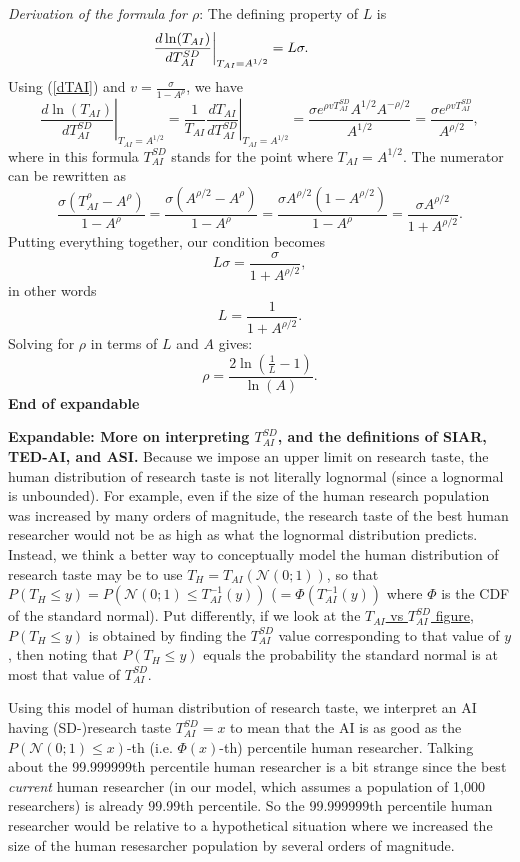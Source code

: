 \documentclass{article}
\theoremstyle{definition}
\begin{document}
\textit{Derivation of the formula for $\rho$}: The defining property of $L$ is
\begin{equation} \label{L}
\left.\frac{d \ln(T_{AI})}{d T_{AI}^{SD}} \right|_{T_{AI} = A^{1/2}} = L \sigma. \hspace*{1.5cm}
\end{equation}
Using (\ref{dTAI}) and $v = \frac{\sigma}{1-A^\rho}$, we have
\[
\left. \frac{d \ln(T_{AI})}{d T_{AI}^{SD}}\right|_{T_{AI} = A^{1/2}} = \left.\frac{1}{T_{AI}}\frac{d T_{AI}}{d T_{AI}^{SD}} \right|_{T_{AI} = A^{1/2}} = \frac{\sigma e^{\rho v T_{AI}^{SD}} A^{1/2} A^{-\rho/2}}{A^{1/2}} = \frac{\sigma e^{\rho v T_{AI}^{SD}}}{A^{\rho/2}},
\]
where in this formula $T_{AI}^{SD}$ stands for the point where $T_{AI} = A^{1/2}$. The numerator can be rewritten as
\[ \frac{\sigma \left(T_{AI}^\rho - A^\rho\right)}{1-A^\rho} = \frac{\sigma \left(A^{\rho/2}-A^\rho\right)}{1-A^\rho} = \frac{\sigma A^{\rho/2} \left(1-A^{\rho/2}\right)}{1-A^\rho} = \frac{\sigma A^{\rho/2}}{1+A^{\rho/2}}.\]
Putting everything together, our condition becomes
\[ L \sigma = \frac{\sigma}{1+A^{\rho/2}},\]
in other words
\[ L = \frac{1}{1+A^{\rho/2}}.\]
Solving for $\rho$ in terms of $L$ and $A$ gives:
\[ \rho = \frac{2 \ln\left(\frac{1}{L}-1\right)}{\ln(A)}.\]
\textbf{End of expandable}

\textbf{Expandable: More on interpreting $T_{AI}^{SD}$, and the definitions of SIAR, TED-AI, and ASI.} Because we impose an upper limit on research taste, the human distribution of research taste is not literally lognormal (since a lognormal is unbounded). For example, even if the size of the human research population was increased by many orders of magnitude, the research taste of the best human researcher would not be as high as what the lognormal distribution predicts. Instead, we think a better way to conceptually model the human distribution of research taste may be to use $T_H = T_{AI}(\mathcal{N}(0;1))$, so that $P(T_H \leq y) = P\left(\mathcal{N}(0;1) \leq T_{AI}^{-1}(y)\right)$ ($= \Phi\left(T_{AI}^{-1}(y)\right)$ where $\Phi$ is the CDF of the standard normal). Put differently, if we look at the \hyperref[TAIvsTAISD]{$T_{AI}$ vs $T_{AI}^{SD}$ figure}, $P(T_H \leq y)$ is obtained by finding the $T_{AI}^{SD}$ value corresponding to that value of $y$, then noting that $P(T_H \leq y)$ equals the probability the standard normal is at most that value of $T_{AI}^{SD}$.

Using this model of human distribution of research taste, we interpret an AI having (SD-)research taste $T_{AI}^{SD} = x$ to mean that the AI is as good as the $P(\mathcal{N}(0;1) \leq x)$-th (i.e. $\Phi(x)$-th) percentile human researcher. Talking about the 99.999999th percentile human researcher is a bit strange since the best \textit{current} human researcher (in our model, which assumes a population of 1,000 researchers) is already 99.99th percentile. So the 99.999999th percentile human researcher would be relative to a hypothetical situation where we increased the size of the human resesarcher population by several orders of magnitude.
\end{document}
